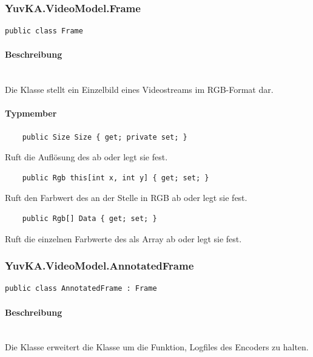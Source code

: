 \subsubsection{YuvKA.VideoModel.Frame}

\begin{verbatim}
public class Frame
\end{verbatim}

\paragraph{Beschreibung}~\\
Die Klasse  stellt ein Einzelbild eines Videostreams im RGB-Format dar.

\paragraph{Typmember}
\begin{itemize}

	\begin{verbatim}
	public Size Size { get; private set; }
	\end{verbatim}
	Ruft die Auflösung des  ab oder legt sie fest.

	\begin{verbatim}
	public Rgb this[int x, int y] { get; set; }
	\end{verbatim}
	Ruft den Farbwert des  an der Stelle  in RGB ab oder legt sie fest.

	\begin{verbatim}
	public Rgb[] Data { get; set; }
	\end{verbatim}
	Ruft die einzelnen Farbwerte des  als Array ab oder legt sie fest.

\end{itemize}

\subsubsection{YuvKA.VideoModel.AnnotatedFrame}

\begin{verbatim}
public class AnnotatedFrame : Frame
\end{verbatim}

\paragraph{Beschreibung}~\\
Die Klasse  erweitert die Klasse  um die Funktion, Logfiles des Encoders zu halten.

